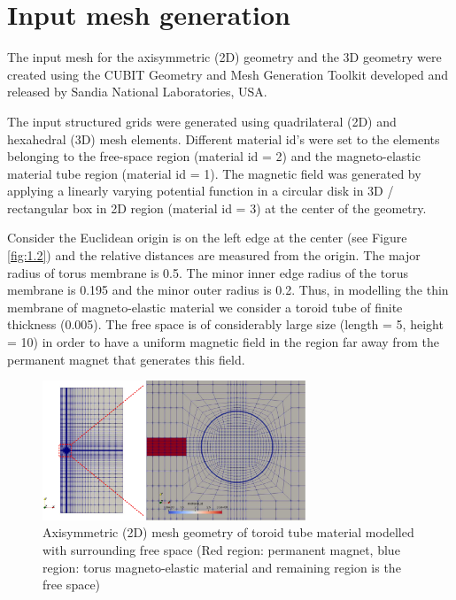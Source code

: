 \documentclass[11pt,a4paper,final]{article}
\begin{document}
\section{Input mesh generation}
The input mesh for the axisymmetric (2D) geometry and the 3D geometry were created using the CUBIT Geometry and Mesh Generation Toolkit \cite{cubit} developed and released by Sandia National Laboratories, USA. \par 

The input structured grids were generated using quadrilateral (2D) and hexahedral (3D) mesh elements. Different material id's were set to the elements belonging to the free-space region (material id = 2) and the magneto-elastic material tube region (material id = 1). The magnetic field was generated by applying a linearly varying potential function in a circular disk in 3D / rectangular box in 2D region (material id = 3) at the center of the geometry. \par 

Consider the Euclidean origin is on the left edge at the center (see Figure \eqref{fig:1.2}) and the relative distances are measured from the origin. The major radius of torus membrane is 0.5. The minor inner edge radius of the torus membrane is 0.195 and the minor outer radius is 0.2. Thus, in modelling the thin membrane of magneto-elastic material we consider a toroid tube of finite thickness (0.005). The free space is of considerably large size (length = 5, height = 10) in order to have a uniform magnetic field in the region far away from the permanent magnet that generates this field. \par 

\begin{figure}[h]
\centering
\includegraphics[width=0.7\textwidth]{2d_mesh.pdf}
\caption{Axisymmetric (2D) mesh geometry of toroid tube material modelled with surrounding free space (Red region: permanent magnet, blue region: torus magneto-elastic material and remaining region is the free space)}
\label{fig:1.2}
\end{figure}
\end{document}
